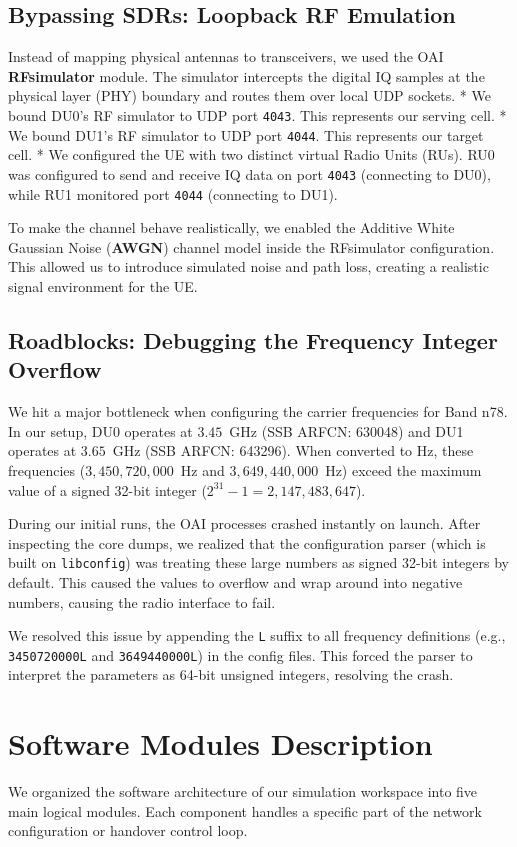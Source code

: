 \subsection{Bypassing SDRs: Loopback RF Emulation}
Instead of mapping physical antennas to transceivers, we used the OAI \textbf{RFsimulator} module. The simulator intercepts the digital IQ samples at the physical layer (PHY) boundary and routes them over local UDP sockets. 
* We bound DU0's RF simulator to UDP port \texttt{4043}. This represents our serving cell.
* We bound DU1's RF simulator to UDP port \texttt{4044}. This represents our target cell.
* We configured the UE with two distinct virtual Radio Units (RUs). RU0 was configured to send and receive IQ data on port \texttt{4043} (connecting to DU0), while RU1 monitored port \texttt{4044} (connecting to DU1).

To make the channel behave realistically, we enabled the Additive White Gaussian Noise (\textbf{AWGN}) channel model inside the RFsimulator configuration. This allowed us to introduce simulated noise and path loss, creating a realistic signal environment for the UE.

\subsection{Roadblocks: Debugging the Frequency Integer Overflow}
We hit a major bottleneck when configuring the carrier frequencies for Band n78. In our setup, DU0 operates at $3.45$~GHz (SSB ARFCN: 630048) and DU1 operates at $3.65$~GHz (SSB ARFCN: 643296). When converted to Hz, these frequencies ($3,450,720,000$~Hz and $3,649,440,000$~Hz) exceed the maximum value of a signed 32-bit integer ($2^{31}-1 = 2,147,483,647$).

During our initial runs, the OAI processes crashed instantly on launch. After inspecting the core dumps, we realized that the configuration parser (which is built on \texttt{libconfig}) was treating these large numbers as signed 32-bit integers by default. This caused the values to overflow and wrap around into negative numbers, causing the radio interface to fail. 

We resolved this issue by appending the \texttt{L} suffix to all frequency definitions (e.g., \texttt{3450720000L} and \texttt{3649440000L}) in the config files. This forced the parser to interpret the parameters as 64-bit unsigned integers, resolving the crash.

\section{Software Modules Description}
\justify
We organized the software architecture of our simulation workspace into five main logical modules. Each component handles a specific part of the network configuration or handover control loop.

